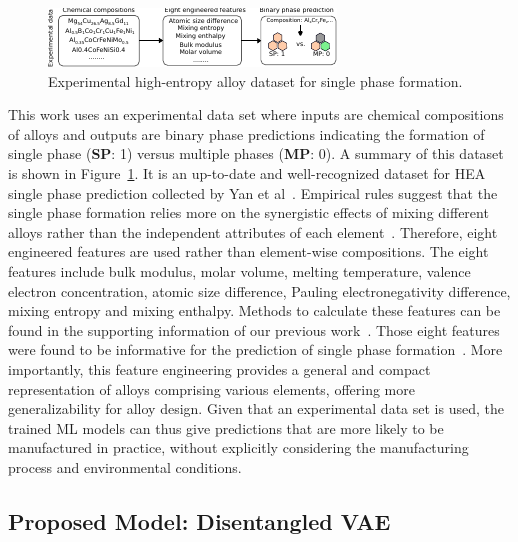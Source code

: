 \documentclass[a4paper]{article}
\begin{document}
\begin{figure}
\centering
\includegraphics[width=5.in]{figures/dataset.pdf}
\caption{Experimental high-entropy alloy dataset for single phase formation.
\label{fig:dataset}}
\end{figure}

This work uses an experimental data set where inputs are chemical compositions of alloys and outputs are binary phase predictions indicating the formation of single phase (\textbf{SP}: 1) versus multiple phases (\textbf{MP}: 0).
A summary of this dataset is shown in Figure~\ref{fig:dataset}.
It is an up-to-date and well-recognized dataset for HEA single phase prediction collected by Yan et al~\cite{yan2021}.
Empirical rules suggest that the single phase formation relies more on the synergistic effects of mixing different alloys rather than the independent attributes of each element~\cite{yan2021, pei2020}.
Therefore, eight engineered features are used rather than element-wise compositions.
The eight features include bulk modulus, molar volume, melting temperature, valence electron concentration, atomic size difference, Pauling electronegativity difference, mixing entropy and mixing enthalpy.
Methods to calculate these features can be found in the supporting information of our previous work~\cite{zeng2024}.
Those eight features were found to be informative for the prediction of single phase formation~\cite{zeng2024, yan2021}.
More importantly, this feature engineering provides a general and compact representation of alloys comprising various elements, offering more generalizability for alloy design.
Given that an experimental data set is used, the trained ML models can thus give predictions that are more likely to be manufactured in practice, without explicitly considering the manufacturing process and environmental conditions.


\subsection{Proposed Model: Disentangled VAE}
\end{document}
